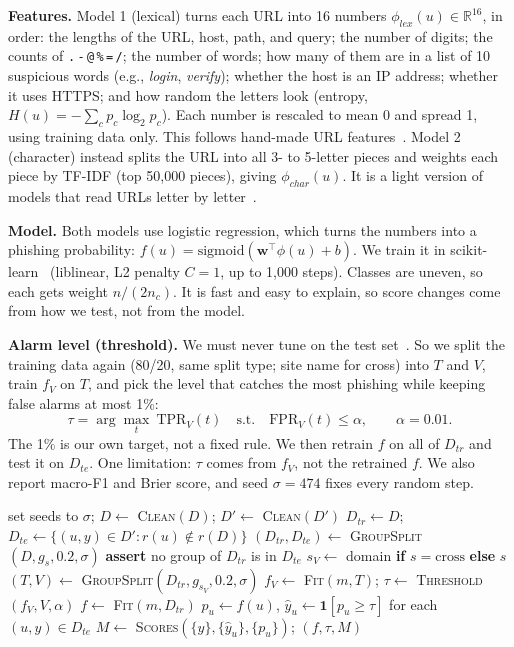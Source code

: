\documentclass[sigconf,nonacm]{acmart}
\begin{document}
\textbf{Features.} Model 1 (lexical) turns each URL into 16 numbers $\phi_{lex}(u)\in\mathbb{R}^{16}$, in order: the lengths of the URL, host, path, and query; the number of digits; the counts of \texttt{.}\,\texttt{-}\,\texttt{@}\,\texttt{\%}\,\texttt{=}\,\texttt{/}; the number of words; how many of them are in a list of 10 suspicious words (e.g., \emph{login}, \emph{verify}); whether the host is an IP address; whether it uses HTTPS; and how random the letters look (entropy, $H(u)=-\sum_c p_c\log_2 p_c$). Each number is rescaled to mean 0 and spread 1, using training data only. This follows hand-made URL features~\cite{sahingoz}. Model 2 (character) instead splits the URL into all 3- to 5-letter pieces and weights each piece by TF-IDF (top 50,000 pieces), giving $\phi_{char}(u)$. It is a light version of models that read URLs letter by letter~\cite{bahnsen}.

\textbf{Model.} Both models use logistic regression, which turns the numbers into a phishing probability: $f(u)=\mathrm{sigmoid}(\mathbf{w}^{\top}\phi(u)+b)$. We train it in scikit-learn~\cite{sklearn} (liblinear, L2 penalty $C=1$, up to 1,000 steps). Classes are uneven, so each gets weight $n/(2n_c)$. It is fast and easy to explain, so score changes come from how we test, not from the model.

\textbf{Alarm level (threshold).} We must never tune on the test set~\cite{arp}. So we split the training data again (80/20, same split type; site name for cross) into $T$ and $V$, train $f_V$ on $T$, and pick the level that catches the most phishing while keeping false alarms at most 1\%:
\[
\tau=\arg\max_{t}\ \mathrm{TPR}_V(t)\quad\text{s.t.}\quad \mathrm{FPR}_V(t)\le\alpha,\qquad \alpha=0.01.
\]
The 1\% is our own target, not a fixed rule. We then retrain $f$ on all of $D_{tr}$ and test it on $D_{te}$. One limitation: $\tau$ comes from $f_V$, not the retrained $f$. We also report macro-F1 and Brier score, and seed $\sigma=474$ fixes every random step.

\begin{algorithm}[t]
\caption{Evaluation method $\Pi$}\label{alg}
\begin{algorithmic}[1]
\State set seeds to $\sigma$; $D\gets$ \textsc{Clean}$(D)$; $D'\gets$ \textsc{Clean}$(D')$
  \State $D_{tr}\gets D$; $D_{te}\gets\{(u,y)\in D' : r(u)\notin r(D)\}$
\Else
  \State $(D_{tr},D_{te})\gets$ \textsc{GroupSplit}$(D,g_s,0.2,\sigma)$
  \State \textbf{assert} no group of $D_{tr}$ is in $D_{te}$
\EndIf
\State $s_V\gets$ domain \textbf{if} $s=\text{cross}$ \textbf{else} $s$
\State $(T,V)\gets$ \textsc{GroupSplit}$(D_{tr},g_{s_V},0.2,\sigma)$
\State $f_V\gets$ \textsc{Fit}$(m,T)$; $\tau\gets$ \textsc{Threshold}$(f_V,V,\alpha)$
\State $f\gets$ \textsc{Fit}$(m,D_{tr})$ 
\State $p_u\gets f(u)$, $\hat{y}_u\gets\mathbf{1}[p_u\ge\tau]$ for each $(u,y)\in D_{te}$
\State $M\gets$ \textsc{Scores}$(\{y\},\{\hat{y}_u\},\{p_u\})$; \Return $(f,\tau,M)$
\end{algorithmic}
\end{algorithm}
\end{document}
